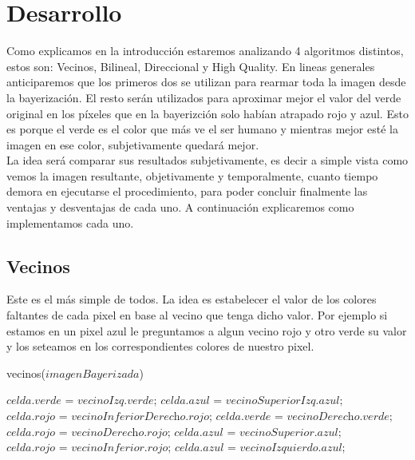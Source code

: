 \section{Desarrollo}

Como explicamos en la introducción estaremos analizando 4 algoritmos distintos, estos son: Vecinos, Bilineal, Direccional y High Quality. En lineas generales anticiparemos que los primeros dos se utilizan para rearmar toda la imagen desde la bayerización. El resto serán utilizados para aproximar mejor el valor del verde original en los píxeles que en la bayerizción solo habían atrapado rojo y azul. Esto es porque el verde es el color que más ve el ser humano y mientras mejor esté la imagen en ese color, subjetivamente quedará mejor.\\
La idea será comparar sus resultados subjetivamente, es decir a simple vista como 
vemos la imagen resultante, objetivamente y temporalmente, cuanto tiempo demora en ejecutarse el procedimiento, para poder concluir finalmente las ventajas y desventajas de cada uno. A continuación explicaremos como 
implementamos cada uno.


\subsection{Vecinos}
Este es el más simple de todos. La idea es estabelecer el valor de los colores faltantes de cada pixel en base al vecino que tenga dicho valor. Por ejemplo si estamos en un pixel azul le preguntamos a algun vecino rojo y 
otro verde su valor y los seteamos en los correspondientes colores de nuestro pixel.

\begin{algorithm}
\caption{vecinos($imagenBayerizada$)}\label{euclid}
\begin{algorithmic}[1]
   
      \State $\textit{celda.verde = vecinoIzq.verde;}$
      \State $\textit{celda.azul  = vecinoSuperiorIzq.azul;}$
  \EndIf
   
      \State $\textit{celda.rojo = vecinoInferiorDerecho.rojo;}$
      \State $\textit{celda.verde = vecinoDerecho.verde;}$
  \EndIf
      \State $\textit{celda.rojo = vecinoDerecho.rojo;}$ 
      \State $\textit{celda.azul = vecinoSuperior.azul;}$ 
  \EndIf
      \State $\textit{celda.rojo = vecinoInferior.rojo;}$ 
      \State $\textit{celda.azul = vecinoIzquierdo.azul;}$ 
  \EndIf
\EndFor
\end{algorithmic}
\end{algorithm}

